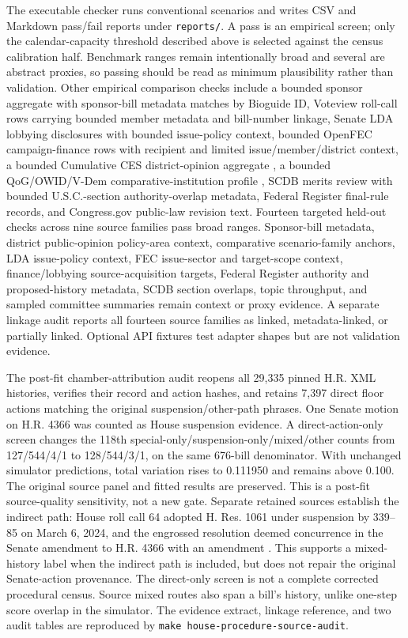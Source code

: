 \documentclass[manuscript]{acmart}
\begin{document}
The executable checker runs conventional scenarios and writes CSV and Markdown pass/fail reports under \texttt{reports/}. A pass is an empirical screen; only the calendar-capacity threshold described above is selected against the census calibration half. Benchmark ranges remain intentionally broad and several are abstract proxies, so passing should be read as minimum plausibility rather than validation. Other empirical comparison checks include a bounded sponsor aggregate with sponsor-bill metadata matches by Bioguide ID, Voteview roll-call rows carrying bounded member metadata and bill-number linkage, Senate LDA lobbying disclosures with bounded issue-policy context, bounded OpenFEC campaign-finance rows with recipient and limited issue/member/district context, a bounded Cumulative CES district-opinion aggregate \citep{CumulativeCES2025}, a bounded QoG/OWID/V-Dem comparative-institution profile \citep{BormannGolder2022,HeniszPOLCON2017,OWIDVDEMJudicial2026,OWIDVDEMLegislative2026}, SCDB merits review with bounded U.S.C.-section authority-overlap metadata, Federal Register final-rule records, and Congress.gov public-law revision text. Fourteen targeted held-out checks across nine source families pass broad ranges. Sponsor-bill metadata, district public-opinion policy-area context, comparative scenario-family anchors, LDA issue-policy context, FEC issue-sector and target-scope context, finance/lobbying source-acquisition targets, Federal Register authority and proposed-history metadata, SCDB section overlaps, topic throughput, and sampled committee summaries remain context or proxy evidence. A separate linkage audit reports all fourteen source families as linked, metadata-linked, or partially linked. Optional API fixtures test adapter shapes but are not validation evidence.

The post-fit chamber-attribution audit reopens all 29,335 pinned H.R. XML histories, verifies their record and action hashes, and retains 7,397 direct floor actions matching the original suspension/other-path phrases. One Senate motion on H.R. 4366 was counted as House suspension evidence. A direct-action-only screen changes the 118th special-only/suspension-only/mixed/other counts from 127/544/4/1 to 128/544/3/1, on the same 676-bill denominator. With unchanged simulator predictions, total variation rises to 0.111950 and remains above 0.100. The original source panel and fitted results are preserved. This is a post-fit source-quality sensitivity, not a new gate. Separate retained sources establish the indirect path: House roll call 64 adopted H. Res. 1061 under suspension by 339--85 on March 6, 2024, and the engrossed resolution deemed concurrence in the Senate amendment to H.R. 4366 with an amendment \citep{HouseRollCall2024064,HouseResolution1061EH}. This supports a mixed-history label when the indirect path is included, but does not repair the original Senate-action provenance. The direct-only screen is not a complete corrected procedural census. Source mixed routes also span a bill's history, unlike one-step score overlap in the simulator. The evidence extract, linkage reference, and two audit tables are reproduced by \texttt{make house-procedure-source-audit}.
\end{document}
